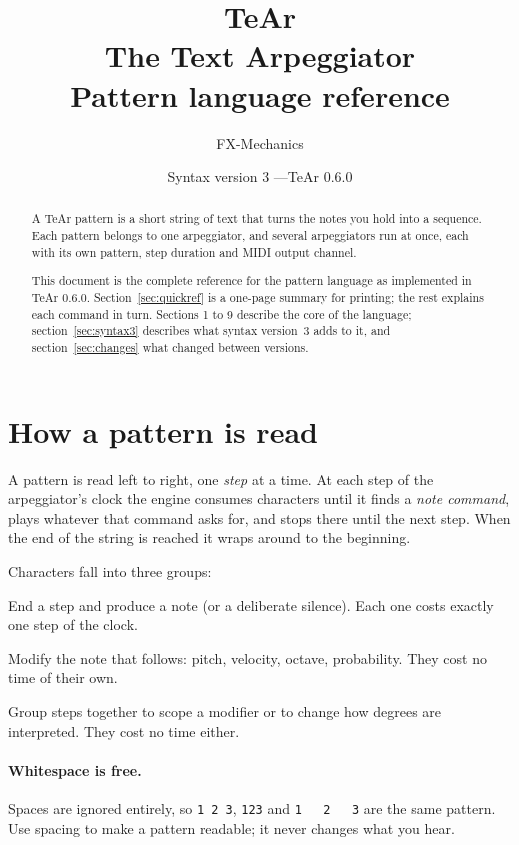 \documentclass[11pt,a4paper]{article}
\title{\textbf{TeAr}\\[2mm]\large The Text Arpeggiator\\[4mm]
       \normalsize Pattern language reference}
\author{FX-Mechanics}
\date{Syntax version 3 \quad---\quad TeAr 0.6.0}
\newcommand{\pat}[1]{\texttt{#1}}
\begin{document}
\maketitle
\thispagestyle{empty}

\begin{abstract}
\noindent
A TeAr pattern is a short string of text that turns the notes you hold into a
sequence. Each pattern belongs to one arpeggiator, and several arpeggiators run
at once, each with its own pattern, step duration and MIDI output channel.

This document is the complete reference for the pattern language as
implemented in TeAr 0.6.0. Section~\ref{sec:quickref} is a one-page summary for
printing; the rest explains each command in turn. Sections 1 to 9 describe the
core of the language; section~\ref{sec:syntax3} describes what syntax version~3
adds to it, and section~\ref{sec:changes} what changed between versions.
\end{abstract}

\tableofcontents
\newpage

\section{How a pattern is read}

A pattern is read left to right, one \emph{step} at a time. At each step of the
arpeggiator's clock the engine consumes characters until it finds a
\emph{note command}, plays whatever that command asks for, and stops there
until the next step. When the end of the string is reached it wraps around to
the beginning.

Characters fall into three groups:

\begin{description}[style=nextline,leftmargin=2em]
  \item[Note commands] End a step and produce a note (or a deliberate silence).
        Each one costs exactly one step of the clock.
  \item[Prefixes] Modify the note that follows: pitch, velocity, octave,
        probability. They cost no time of their own.
  \item[Block markers] Group steps together to scope a modifier or to change
        how degrees are interpreted. They cost no time either.
\end{description}

\paragraph{Whitespace is free.} Spaces are ignored entirely, so
\pat{1 2 3}, \pat{123} and \pat{1~~~2~~~3} are the same pattern. Use spacing to
make a pattern readable; it never changes what you hear.
\end{document}
